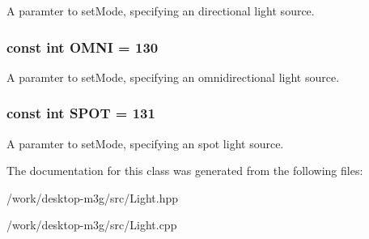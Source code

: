 A paramter to setMode, specifying an directional light source. \hypertarget{classm3g_1_1Light_34d360bb8395ad7fbcd3ec286ece64cb}{
\subsubsection[{OMNI}]{\setlength{\rightskip}{0pt plus 5cm}const int {\bf OMNI} = 130}}
\label{classm3g_1_1Light_34d360bb8395ad7fbcd3ec286ece64cb}


A paramter to setMode, specifying an omnidirectional light source. \hypertarget{classm3g_1_1Light_c44aef16b96dc8fd8b134416964a7de9}{
\subsubsection[{SPOT}]{\setlength{\rightskip}{0pt plus 5cm}const int {\bf SPOT} = 131}}
\label{classm3g_1_1Light_c44aef16b96dc8fd8b134416964a7de9}


A paramter to setMode, specifying an spot light source. 

The documentation for this class was generated from the following files:\begin{CompactItemize}
\item 
/work/desktop-m3g/src/Light.hpp\item 
/work/desktop-m3g/src/Light.cpp\end{CompactItemize}
